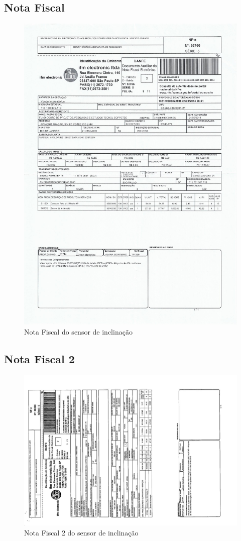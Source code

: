 \subsection{Nota Fiscal}
\begin{figure}[H]
 \centering
 \includegraphics[width=1\columnwidth]{Inclinacao/nota_ifm1.pdf}
 \caption{Nota Fiscal do sensor de inclinação}
 \end{figure} 
 
 \subsection{Nota Fiscal 2}
\begin{figure}[H]
 \centering
 \includegraphics[width=1\columnwidth, angle=270 ]{Inclinacao/nota_ifm2.pdf}
 \caption{Nota Fiscal 2 do sensor de inclinação}
 \end{figure} 